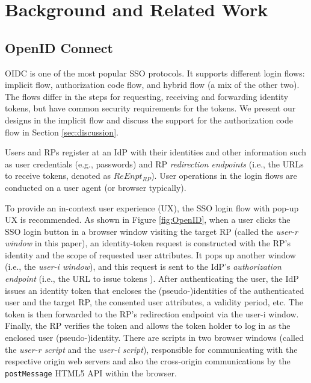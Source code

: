 \section{Background and Related Work}
\label{sec:background}

\subsection{OpenID Connect}
\label{subsec:OIDC}
OIDC \cite{OpenIDConnect} is one of the most popular SSO protocols. It supports different login flows: implicit flow, authorization code flow, and hybrid flow (a mix of the other two).
The flows differ in the steps for requesting, receiving and forwarding identity tokens, but have common security requirements for the tokens.
We present our designs in the implicit flow and discuss the support for the authorization code flow in Section \ref{sec:discussion}.

Users and RPs register at an IdP with their identities
and other information such as user credentials (e.g., passwords)
and RP \emph{redirection endpoints} \cite{rfc6749} (i.e., the URLs to receive tokens,
denoted as $ReEnpt_{RP}$).
User operations in the login flows are conducted on a user agent (or browser typically).

To provide an in-context user experience (UX),
    the SSO login flow with pop-up UX \cite{dimvaLiM16,GoogleIdIntegrate,uber} is recommended.
As shown in Figure \ref{fig:OpenID},
when a user clicks the SSO login button in a browser window visiting the target RP 
(called the \emph{user-r window} in this paper),
 an identity-token request is constructed with the RP's identity and the scope of requested user attributes.
It pops up another window (i.e., the \emph{user-i window}),
    and this request is sent to the IdP's \emph{authorization endpoint} (i.e., the URL to issue tokens \cite{rfc6749}).
After authenticating the user, the IdP issues an identity token that encloses the (pseudo-)identities of the authenticated user and the target RP, the consented user attributes, a validity period, etc.
The token is then forwarded to the RP's redirection endpoint via the user-i window.
Finally, the RP verifies the token and allows the token holder to log in as the enclosed user (pseudo-)identity.
There are scripts in two browser windows (called the \emph{user-r script} and the \emph{user-i script}),
    responsible for communicating with the respective origin web servers
    and also the cross-origin
communications by the \verb+postMessage+ HTML5 API \cite{postm-targeto} within the browser.


